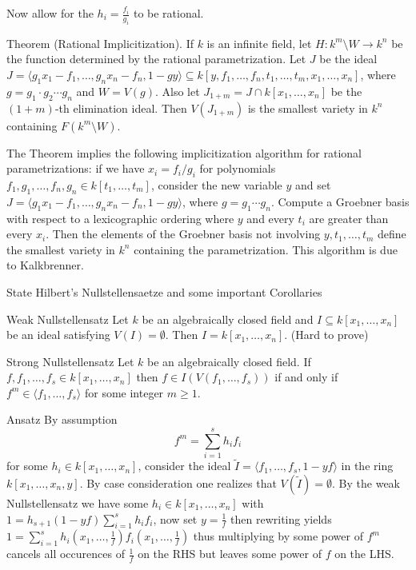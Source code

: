 Now allow for the \( h_i = \frac{f_i}{g_i} \) to be rational.

Theorem (Rational Implicitization).
If \( k \) is an infinite field, let \( H : k^m \setminus W \to k^n \) be the function determined by the rational parametrization. 
Let \( J \) be the ideal 
\( J = \langle g_1 x_1 - f_1, \ldots, g_n x_n - f_n, 1 - g y \rangle \subseteq k[y, f_1, \ldots, f_n, t_1, \ldots, t_m, x_1, \ldots, x_n] \), 
where \( g = g_1 \cdot g_2 \cdots g_n \) and \( W = V(g) \). 
Also let \( J_{1+m} = J \cap k[x_1, \ldots, x_n] \) be the \( (1+m) \)-th elimination ideal. 
Then \( V(J_{1+m}) \) is the smallest variety in \( k^n \) containing \( F(k^m \setminus W) \).

The Theorem implies the following implicitization algorithm for rational parametrizations: 
if we have \(x_i = f_i/g_i\) for polynomials \(f_1, g_1, \ldots, f_n, g_n \in k[t_1, \ldots, t_m]\), 
consider the new variable \(y\) and set \(J = \langle g_1 x_1 - f_1, \ldots, g_n x_n - f_n, 1 - g y \rangle\), 
where \(g = g_1 \cdots g_n\). Compute a Groebner basis with respect to a lexicographic ordering where 
\(y\) and every \(t_i\) are greater than every \(x_i\). 
Then the elements of the Groebner basis not involving \(y, t_1, \ldots, t_m\) define the smallest variety in \(k^n\) containing the parametrization. 
This algorithm is due to Kalkbrenner.



State Hilbert's Nullstellensaetze and some important Corollaries


Weak Nullstellensatz
Let \( k \) be an algebraically closed field and \( I \subseteq k[x_1, \dots, x_n] \) be an ideal satisfying \( V(I) = \emptyset \). 
Then \( I = k[x_{1}, \dots, x_n] \).
(Hard to prove)

Strong Nullstellensatz
Let \( k \) be an algebraically closed field.
If \( f, f_1, \dots, f_s \in k[x_1, \dots, x_n] \) then \( f \in I(V(f_1, \dots, f_s)) \) if and only if
\( f^m \in \langle f_1, \dots, f_s \rangle \) for some integer \( m \geq 1 \).

Ansatz
By assumption
\[
    f^m = \sum_{i=1}^s h_i f_i
\]
for some \( h_i \in k[x_1, \dots, x_n] \), consider the ideal \( \tilde{I} = \langle f_1, \dots, f_s,  1 - yf \rangle  \)
in the ring \( k[x_1, \dots, x_n, y] \). By case consideration one realizes that \( V(\tilde{I}) = \emptyset \).
By the weak Nullstellensatz we have some \( h_i \in k[x_1, \dots, x_n] \) with
\( 1 = h_{s+1}(1 - yf) \sum_{i=1}^s h_i f_i  \), now set \( y = \frac{1}{f} \) then rewriting yields
\( 1 = \sum_{i=1}^s h_i(x_1, \dots, \frac{1}{f}) f_i(x_1, \dots, \frac{1}{f}) \) 
thus multiplying by some power of \( f^m \) cancels all occurences of \( \frac{1}{f} \) on the RHS but leaves some power of \( f \) on the LHS.

